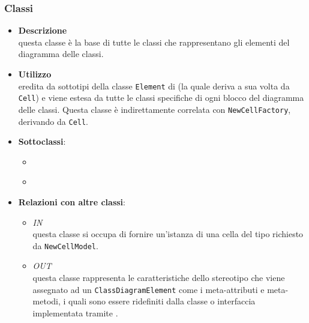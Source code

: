 \subsubsection{Classi}
\label{\nogloxy{swedesigner::client::model::celltypes::class::ClassDiagramElement}}
\begin{itemize}
\item \textbf{Descrizione}\\
questa classe è la base di tutte le classi che rappresentano gli elementi del diagramma delle classi.
\item \textbf{Utilizzo}\\
eredita da sottotipi della classe \texttt{Element} di \jointjs{} (la quale deriva a sua volta da \texttt{Cell}) e viene estesa da tutte le classi specifiche di ogni blocco del diagramma delle classi. Questa classe è indirettamente correlata con \texttt{NewCellFactory}, derivando da \texttt{Cell}.
\item \textbf{Sottoclassi}:
\begin{itemize}
\item \hyperref[\nogloxy{swedesigner::client::model::celltypes::class::HxClass}]{}
\item \hyperref[\nogloxy{swedesigner::client::model::celltypes::class::HxInterface}]{}
\end{itemize}
\item \textbf{Relazioni con altre classi}:
\begin{itemize}
\item \textit{IN} \hyperref[\nogloxy{swedesigner::client::model::NewCellFactory}]{}\\
questa classe si occupa di fornire un'istanza di una cella del tipo richiesto da \texttt{NewCellModel}. 
\item \textit{OUT} \hyperref[\nogloxy{swedesigner::client::model::celltypes::HxStereotype}]{}\\
questa classe rappresenta le caratteristiche dello stereotipo che viene assegnato ad un \texttt{ClassDiagramElement} come i meta-attributi e meta-metodi, i quali sono essere ridefiniti dalla classe o interfaccia implementata tramite \proj{}. 
\end{itemize}
\end{itemize}

